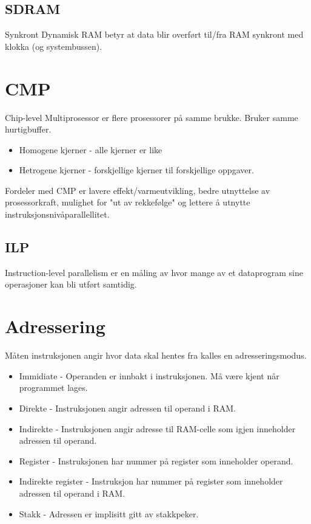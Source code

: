 \documentclass[a4paper, 10pt]{article}
\begin{document}
\subsection{SDRAM} 
Synkront Dynamisk RAM betyr at data blir overført til/fra RAM synkront med klokka (og systembussen).

\section{CMP}
Chip-level Multiprosessor er flere prosessorer på samme brukke. Bruker samme hurtigbuffer.

\begin{itemize}
	\item Homogene kjerner - alle kjerner er like
	\item Hetrogene kjerner - forskjellige kjerner til forskjellige oppgaver.
\end{itemize}

Fordeler med CMP er lavere effekt/varmeutvikling, bedre utnyttelse av prosessorkraft, mulighet for "ut av rekkefølge" og lettere å utnytte instruksjonsnivåparallellitet.

\subsection{ILP}
Instruction-level parallelism er en måling av hvor mange av et dataprogram sine operasjoner kan bli utført samtidig.



\section{Adressering}
Måten instruksjonen angir hvor data skal hentes fra kalles en adresseringsmodus.

\begin{itemize}
	\item Immidiate - Operanden er innbakt i instruksjonen. Må være kjent når programmet lages.
	\item Direkte - Instruksjonen angir adressen til operand i RAM.
	\item Indirekte - Instruksjonen angir adresse til RAM-celle som igjen inneholder adressen til operand.
	\item Register - Instruksjonen har nummer på register som inneholder operand.
	\item Indirekte register - Instruksjon har nummer på register som inneholder adressen til operand i RAM.
	\item Stakk - Adressen er implisitt gitt av stakkpeker.
\end{itemize}
\end{document}
